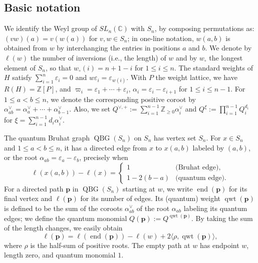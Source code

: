 \documentclass[11pt,a4paper,reqno]{amsart}
\DeclareRobustCommand{\rev}[1]{{\color{revision}#1}}
\numberwithin{equation}{section}
\theoremstyle{definition}
\DeclareMathOperator{\QBG}{QBG}
\DeclareMathOperator{\End}{end}
\DeclareMathOperator{\qwt}{qwt}
\newcommand{\Z}{\mathbb Z}
\newcommand{\C}{\mathbb C}
\newcommand{\pp}{\mathbf p}
\newcommand{\eps}{\varepsilon}
\newcommand{\wlong}{w_\circ}
\begin{document}
\subsection{Basic notation}
\rev{We identify the Weyl group of \(SL_n(\C)\) with \(S_n\), by composing permutations as: \((vw)(a)=v(w(a))\) for \(v, w \in S_n\); in one-line notation, \(w(a,b)\) is obtained from \(w\) by interchanging the entries in positions \(a\) and \(b\). We denote by \(\ell(w)\) the number of inversions (i.e., the length) of \(w\) and by \(\wlong\) the longest element of \(S_n\), so that \(\wlong(i)=n+1-i\) for \(1 \le i \le n\). The standard weights of \(H\) satisfy \(\sum_{i=1}^n\eps_i=0\) and \(w\eps_i=\eps_{w(i)}\). With \(P\) the weight lattice, we have \(R(H)=\Z[P]\), and \(\varpi_i=\eps_1+\cdots+\eps_i\), \(\alpha_i=\eps_i-\eps_{i+1}\) for \(1 \le i \le n-1\). For \(1 \le a < b \le n\), we denote the corresponding positive coroot by \(\alpha_{ab}^{\vee}=\alpha_a^\vee+\cdots+\alpha_{b-1}^\vee\).}
\rev{Also, we set \(Q^{\vee,+} :=\sum_{i=1}^{n-1} \Z_{\ge 0}\alpha_i^\vee\) and \(Q^\xi:=\prod^{n-1}_{i=1} Q_i^{d_i}\) for \(\xi=\sum_{i=1}^{n-1} d_i\alpha_i^\vee\).}

\rev{The quantum Bruhat graph \(\QBG(S_n)\) on \(S_n\) has vertex set \(S_n\). For \(x\in S_n\) and \(1\le a<b\le n\), it has a directed edge from \(x\) to \(x(a,b)\) labeled by \((a,b)\), or the root \(\alpha_{ab}=\varepsilon_a-\varepsilon_b\), precisely when}
\[
\ell(x(a,b))-\ell(x)=
\begin{cases}
 1 &\text{(Bruhat edge)},\\
 1-2(b-a)&\text{(quantum edge)}.
\end{cases}
\]
For a directed path \(\pp\) in \(\QBG(S_n)\) starting at \(w\), we write \(\End(\pp)\) for its final vertex and \(\ell(\pp)\) for its number of edges. Its (quantum) weight \(\qwt(\pp)\) is defined to be the sum of the coroots \(\alpha_{ab}^\vee\) of the root \(\alpha_{ab}\) labeling its quantum edges; we define the quantum monomial \(Q(\pp) := Q^{\qwt(\pp)}\). By taking the sum of the length changes, we easily obtain 
\begin{equation}\label{eq:length}
 \ell(\pp)=\ell(\End(\pp))-\ell(w)+2\langle\rho,\qwt(\pp)\rangle ,
\end{equation}
where \(\rho\) is the half-sum of positive roots. The empty path at \(w\) has endpoint \(w\), length zero, and quantum monomial \(1\).
\end{document}
